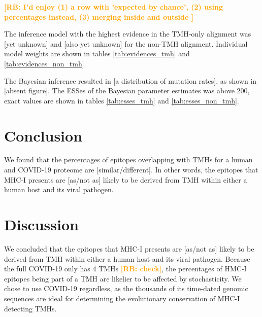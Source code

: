 \documentclass{article}
\newcommand{\richel}[1]{\textcolor{orange}{\textbf{[RB: #1]}}}
\begin{document}
	
	\richel{
	  I'd enjoy 
	  (1) a row with 'expected by chance', 
	  (2) using percentages instead,
	  (3) merging inside and outside
	}

	The inference model with the highest evidence in the
	TMH-only alignment was [yet unknown] and [also yet unknown]
	for the non-TMH alignment. Individual model weights are shown
	in tables \ref{tab:evidences_tmh} 
	and \ref{tab:evidences_non_tmh}.

	The Bayesian inference resulted in [a distribution of mutation rates],
	as shown in [absent figure].
	The ESSes of the Bayesian parameter estimates was above 200, exact values
	are shown in tables \ref{tab:esses_tmh} and \ref{tab:esses_non_tmh}.
\fi

\section{Conclusion}

We found that the percentages of epitopes overlapping 
with TMHs for a human and COVID-19 proteome are 
[similar/different]. In other words, the
epitopes that MHC-I presents are [as/not as] likely 
to be derived from TMH within either a human host and its viral pathogen.

\section{Discussion}

We concluded that the
epitopes that MHC-I presents are [as/not as] likely 
to be derived from TMH within either a human host and its viral pathogen.
Because the full COVID-19 only has 4 TMHs \richel{check}, the percentages
of HMC-I epitopes being part of a TMH are likelier to be affected by
stochasticity. We chose to use COVID-19 regardless, as the thousands
of its time-dated genomic sequences are ideal for determining the 
evolutionary conservation of MHC-I detecting TMHs. 
\end{document}
